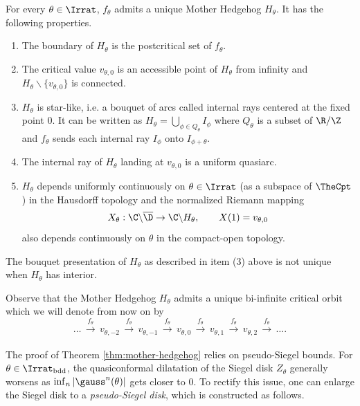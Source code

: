 \documentclass{amsart}
\begin{document}
\begin{theorem}
\label{thm:mother-hedgehog}
    For every $\theta \in \Irrat$, $f_\theta$ admits a unique Mother Hedgehog $H_\theta$. It has the following properties.
    \begin{enumerate}
        \item The boundary of $H_\theta$ is the postcritical set of $f_\theta$. 
        \item The critical value $v_{\theta,0}$ is an accessible point of $H_\theta$ from infinity and $H_\theta \backslash \{v_{\theta,0}\}$ is connected.
        \item $H_\theta$ is star-like, i.e. a bouquet of arcs called internal rays centered at the fixed point $0$. 
        It can be written as $H_\theta = \bigcup_{\phi \in Q_{\theta}} I_{\phi}$ where $Q_\theta$ is a subset of $\R/ \Z$ and $f_{\theta}$ sends each internal ray $I_{\phi}$ onto $I_{\phi+\theta}$.
        \item The internal ray of $H_\theta$ landing at $v_{\theta,0}$ is a uniform quasiarc. 
        \item $H_{\theta}$ depends uniformly continuously on $\theta \in \Irrat$ (as a subspace of $\TheCpt$) in the Hausdorff topology and the normalized Riemann mapping
        \[
            X_{\theta} : \C \backslash \overline{\D} \to \C \backslash H_{\theta}, \quad 
            \quad X(1) = v_{\theta,0}
        \]
        also depends continuously on $\theta$ in the compact-open topology.
    \end{enumerate}
\end{theorem}

\begin{remark}
    The bouquet presentation of $H_\theta$ as described in item (3) above is not unique when $H_\theta$ has interior.
\end{remark}

Observe that the Mother Hedgehog $H_\theta$ admits a unique bi-infinite critical orbit which we will denote from now on by
\[
    \ldots \, \xrightarrow[\quad]{f_\theta} \, v_{\theta,-2} \, \xrightarrow[\quad]{f_\theta} \, v_{\theta,-1} \, \xrightarrow[\quad]{f_\theta} \,
    v_{\theta,0} \, \xrightarrow[\quad]{f_\theta} \, v_{\theta,1} \, \xrightarrow[\quad]{f_\theta} \, v_{\theta,2} \, \xrightarrow[\quad]{f_\theta} \, \ldots.
\]

The proof of Theorem \ref{thm:mother-hedgehog} relies on pseudo-Siegel bounds. 
For $\theta \in \Irrat_{\text{bdd}}$, the quasiconformal dilatation of the Siegel disk $Z_{\theta}$ generally worsens as $\inf_n |\gauss^n(\theta)|$ gets closer to $0$. 
To rectify this issue, one can enlarge the Siegel disk to a \emph{pseudo-Siegel disk}, which is constructed as follows.
\end{document}
